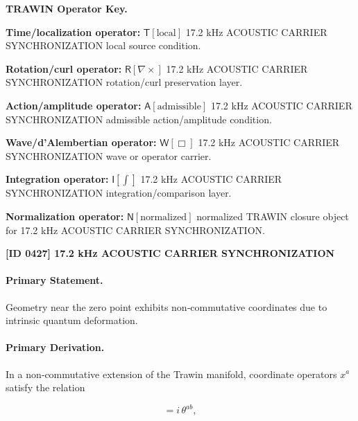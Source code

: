 \par\vspace{0.45\baselineskip}
\noindent\begin{minipage}[t]{\linewidth}
\begingroup
\small
\raggedright
\textbf{TRAWIN Operator Key.}\par
\noindent\textbf{Time/localization operator:} $\mathsf{T}\!\left[\mathrm{local}\right]$ 17.2 kHz ACOUSTIC CARRIER SYNCHRONIZATION local source condition.\par
\noindent\textbf{Rotation/curl operator:} $\mathsf{R}\!\left[\nabla\times\right]$ 17.2 kHz ACOUSTIC CARRIER SYNCHRONIZATION rotation/curl preservation layer.\par
\noindent\textbf{Action/amplitude operator:} $\mathsf{A}\!\left[\mathrm{admissible}\right]$ 17.2 kHz ACOUSTIC CARRIER SYNCHRONIZATION admissible action/amplitude condition.\par
\noindent\textbf{Wave/d'Alembertian operator:} $\mathsf{W}\!\left[\Box\right]$ 17.2 kHz ACOUSTIC CARRIER SYNCHRONIZATION wave or operator carrier.\par
\noindent\textbf{Integration operator:} $\mathsf{I}\!\left[\int\right]$ 17.2 kHz ACOUSTIC CARRIER SYNCHRONIZATION integration/comparison layer.\par
\noindent\textbf{Normalization operator:} $\mathsf{N}\!\left[\mathrm{normalized}\right]$ normalized TRAWIN closure object for 17.2 kHz ACOUSTIC CARRIER SYNCHRONIZATION.\par
\endgroup
\end{minipage}

\clearpage
\noindent\textbf{[ID 0427] 17.2 kHz ACOUSTIC CARRIER SYNCHRONIZATION}\par
\vspace{0.35em}
\paragraph{Primary Statement.}

Geometry near the zero point exhibits non‑commutative coordinates due to intrinsic quantum deformation.

\paragraph{Primary Derivation.}

In a non‑commutative extension of the Trawin manifold, coordinate operators $x^a$ satisfy the relation

\begin{equation}
[ x^a , x^b ] = i\,\theta^{ab},
\end{equation}

